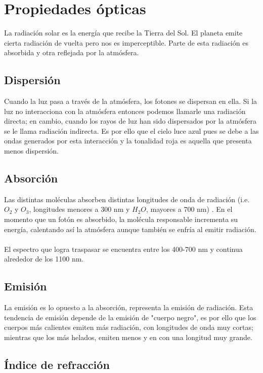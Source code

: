 \documentclass{article}
\begin{document}
    
\section{Propiedades ópticas}

La radiación solar es la energía que recibe la Tierra del Sol. El planeta emite cierta radiación de vuelta pero nos es imperceptible. Parte de esta radiación es absorbida y otra reflejada por la atmósfera.
    
    \subsection{Dispersión}
    
    Cuando la luz pasa a través de la atmósfera, los fotones se dispersan en ella. Si la luz no interacciona con la atmósfera entonces podemos llamarle una radiación directa; en cambio, cuando los rayos de luz han sido dispersados por la atmósfera se le llama radiación indirecta. Es por ello que el cielo luce azul pues se debe a las ondas generados por esta interacción y la tonalidad roja es aquella que presenta menos dispersión.
    
    \subsection{Absorción}
    
    Las distintas moléculas absorben distintas longitudes de onda de radiación (i.e. $O_2$ y $O_3$, longitudes menores a 300 nm y $H_2 O$, mayores a 700 nm) . En el momento que un fotón es absorbido, la molécula responsable incrementa su energía, calentando así la atmósfera aunque también se enfría al emitir radiación.
    \\
    \\ El espectro que logra traspasar se encuentra entre los 400-700 nm y continua alrededor de los 1100 nm.
    
    \subsection{Emisión}
    
    La emisión es lo opuesto a la absorción, representa la emisión de radiación. Esta tendencia de emisión depende de la emisión de "cuerpo negro", es por ello que los cuerpos más calientes emiten más radiación, con longitudes de onda muy cortas; mientras que los más helados, emiten menos y en con una longitud muy grande.
    
    \subsection{Índice de refracción}
    
\end{document}
